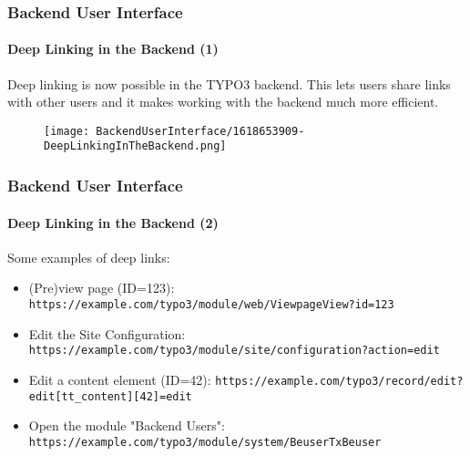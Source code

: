 %

\begin{frame}[fragile]
	\frametitle{Backend User Interface}
	\framesubtitle{Deep Linking in the Backend (1)}

	Deep linking is now possible in the TYPO3 backend. This lets users share links
	with other users and it makes working with the backend much more efficient.

	\begin{figure}
		\texttt{[image: BackendUserInterface/1618653909-DeepLinkingInTheBackend.png]}
	\end{figure}

\end{frame}


\begin{frame}[fragile]
	\frametitle{Backend User Interface}
	\framesubtitle{Deep Linking in the Backend (2)}

	Some examples of deep links:
	\vspace{0.2cm}
	\begin{itemize}
		\item (Pre)view page (ID=123):\newline
			\fontsize{8}{10}\texttt{https://example.com/typo3/module/web/ViewpageView?id=123}\normalsize
		\item Edit the Site Configuration:
			\fontsize{8}{10}\texttt{https://example.com/typo3/module/site/configuration?action=edit}\normalsize
		\item Edit a content element (ID=42):
			\fontsize{8}{10}\texttt{https://example.com/typo3/record/edit?edit[tt\_content][42]=edit}\normalsize
		\item Open the module "Backend Users":
			\fontsize{8}{10}\texttt{https://example.com/typo3/module/system/BeuserTxBeuser}\normalsize
	\end{itemize}

\end{frame}

